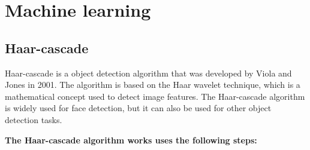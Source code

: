 \section{Machine learning}

\subsection{Haar-cascade}
Haar-cascade is a object detection algorithm that was developed by Viola and
Jones in 2001. The algorithm is based on the Haar wavelet technique, which is a
mathematical concept used to detect image features. The Haar-cascade algorithm
is widely used for face detection, but it can also be used for other object
detection tasks. \cite{hrcs:haar-cascades}

\textbf{The Haar-cascade algorithm works uses the following steps:}
